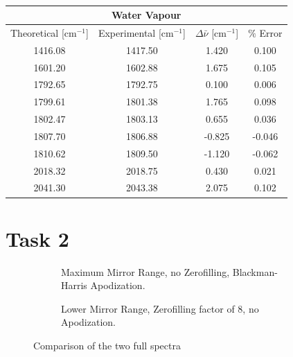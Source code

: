 \documentclass{article}
\begin{document}
\begin{appendices}
\begin{table}[h!]
	\centering
	\begin{tabular}{|cccc|}
	\hline
	\multicolumn{4}{|c|}{Water Vapour}                                                                  \\ \hline
	\multicolumn{1}{|c|}{Theoretical {[}cm$^{-1}${]}} &
	  \multicolumn{1}{c|}{Experimental {[}cm$^{-1}${]}} &
	  \multicolumn{1}{c|}{$\Delta \bar{\nu}$ {[}cm$^{-1}${]}} &
	  $\%$ Error \\ \hline
	\multicolumn{1}{|c|}{1416.08} & \multicolumn{1}{c|}{1417.50} & \multicolumn{1}{c|}{1.420}  & 0.100  \\ \hline
	\multicolumn{1}{|c|}{1601.20} & \multicolumn{1}{c|}{1602.88} & \multicolumn{1}{c|}{1.675}  & 0.105  \\ \hline
	\multicolumn{1}{|c|}{1792.65} & \multicolumn{1}{c|}{1792.75} & \multicolumn{1}{c|}{0.100}  & 0.006  \\ \hline
	\multicolumn{1}{|c|}{1799.61} & \multicolumn{1}{c|}{1801.38} & \multicolumn{1}{c|}{1.765}  & 0.098  \\ \hline
	\multicolumn{1}{|c|}{1802.47} & \multicolumn{1}{c|}{1803.13} & \multicolumn{1}{c|}{0.655}  & 0.036  \\ \hline
	\multicolumn{1}{|c|}{1807.70} & \multicolumn{1}{c|}{1806.88} & \multicolumn{1}{c|}{-0.825} & -0.046 \\ \hline
	\multicolumn{1}{|c|}{1810.62} & \multicolumn{1}{c|}{1809.50} & \multicolumn{1}{c|}{-1.120} & -0.062 \\ \hline
	\multicolumn{1}{|c|}{2018.32} & \multicolumn{1}{c|}{2018.75} & \multicolumn{1}{c|}{0.430}  & 0.021  \\ \hline
	\multicolumn{1}{|c|}{2041.30} & \multicolumn{1}{c|}{2043.38} & \multicolumn{1}{c|}{2.075}  & 0.102  \\ \hline
	\end{tabular}
	\caption{}
	\label{tab:watervapour}
\end{table}

\section{Task 2}
\label{app:task2}

\begin{figure}[h!]
	\centering
	\begin{subfigure}[t]{0.48\textwidth}
		\centering
		\scalebox{0.5}{}
		\caption{Maximum Mirror Range, no Zerofilling, Blackman-Harris Apodization.}
		\label{fig:air32000ComparisonFull}
	\end{subfigure} \hfill
	\begin{subfigure}[t]{0.48\textwidth}
		\centering
		\scalebox{0.5}{}
		\caption{Lower Mirror Range, Zerofilling factor of 8, no Apodization.}
		\label{fig:air8000ComparisonFull}
	\end{subfigure}
	\caption{Comparison of the two full spectra}
	\label{fig:comparisonfull}
\end{figure}

\end{appendices}

\pagebreak{}

 
 
\end{document}
